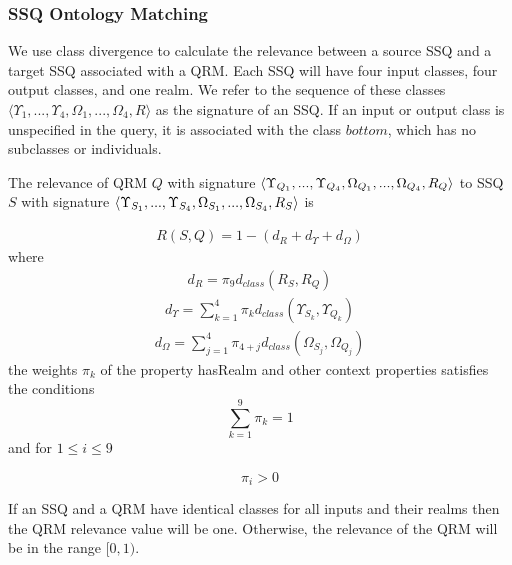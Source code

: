 \documentclass{www2010-submission}
\begin{document}
\subsubsection{SSQ Ontology Matching}
\label{sec:oqom}

We use class divergence to calculate the relevance between a source SSQ and a target SSQ associated with a QRM.  Each SSQ will have four input classes, four output classes, and one realm.  We refer to the sequence of these classes $\langle \Upsilon_1, ..., \Upsilon_4, \Omega_1, ..., \Omega_4, R \rangle$ as the signature of an SSQ. If an input or output class is unspecified in the query, it is associated with the class $bottom$, which has no subclasses or individuals.

The relevance of QRM $Q$ with signature $\langle \Upsilon_{Q_1}, ..., \Upsilon_{Q_4}, \\\Omega_{Q_1}, ... , \Omega_{Q_4}, R_Q\rangle$ to SSQ $S$ with signature $\langle \Upsilon_{S_1}, ..., \Upsilon_{S_4}, \\\Omega_{S_1}, ... , \Omega_{S_4}, R_S \rangle$ is

\begin{eqnarray}
\label{qrmsimilarity}
 R(S,Q) = 1 - (d_{R} + d_{\Upsilon} + d_{\Omega})
\end{eqnarray}
\noindent where 
\begin{eqnarray}
d_{R} = \pi_9 d_{class}(R_S,R_Q) \nonumber
\end{eqnarray}
\begin{eqnarray}
d_{\Upsilon}  = \sum_{k=1}^4 {\pi_k} {d_{class}(\Upsilon_{S_k},\Upsilon_{Q_k})} \nonumber
\end{eqnarray}
\begin{eqnarray}
 d_{\Omega} = \sum_{j=1}^4 \pi_{4+j} d_{class}(\Omega_{S_j},\Omega_{Q_j})  \nonumber
\end{eqnarray}
\noindent the weights ${\pi}_k$ of the property hasRealm and other context properties satisfies the conditions 
\begin{equation}
\label{piconstraint1}
\sum_{k=1}^{9} {{\pi}_k} = 1
\end{equation}
\noindent and for $1 \leq i \leq 9$

\begin{equation}
\label{piconstraint2}
{\pi}_i > 0
\end{equation}

If an SSQ and a QRM have identical classes for all inputs and their realms then the QRM relevance value will be one. Otherwise, the relevance of the QRM will be in the range $[0, 1)$.   
\end{document}
